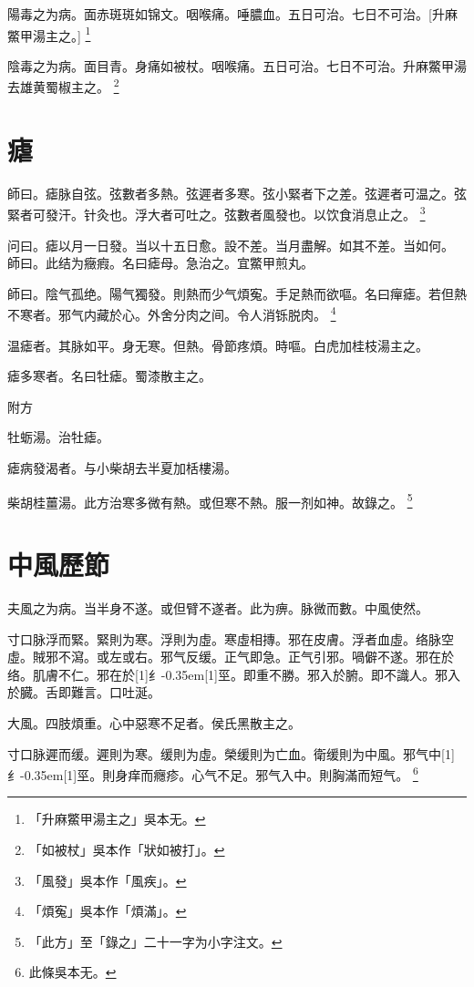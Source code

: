\documentclass[11pt,oneside,b5paper]{ctexbook}
\begin{document}
\begin{flushleft}
陽毒之为病。面赤斑斑如锦文。咽喉痛。唾膿血。五日可治。七日不可治。[升麻鱉甲湯主之。]
\footnote{「升麻鱉甲湯主之」吳本无。}

陰毒之为病。面目青。身痛如被杖。咽喉痛。五日可治。七日不可治。升麻鱉甲湯去雄黄蜀椒主之。
\footnote{「如被杖」吳本作「狀如被打」。}

\chapter{瘧}

師曰。瘧脉自弦。弦數者多熱。弦遲者多寒。弦小緊者下之差。弦遲者可温之。弦緊者可發汗。针灸也。浮大者可吐之。弦數者風發也。以饮食消息止之。
\footnote{「風發」吳本作「風疾」。}

问曰。瘧以月一日發。当以十五日愈。設不差。当月盡解。如其不差。当如何。\\
師曰。此结为癥瘕。名曰瘧母。急治之。宜鱉甲煎丸。

師曰。陰气孤绝。陽气獨發。則熱而少气煩寃。手足熱而欲嘔。名曰癉瘧。若但熱不寒者。邪气内藏於心。外舍分肉之间。令人消铄脱肉。
\footnote{「煩寃」吳本作「煩滿」。}

温瘧者。其脉如平。身无寒。但熱。骨節疼煩。時嘔。白虎加桂枝湯主之。

瘧多寒者。名曰牡瘧。蜀漆散主之。

附方

牡蛎湯。治牡瘧。

瘧病發渴者。与小柴胡去半夏加栝樓湯。

柴胡桂薑湯。此方治寒多微有熱。或但寒不熱。服一剂如神。故錄之。
\footnote{「此方」至「錄之」二十一字为小字注文。}

\chapter{中風歷節}

夫風之为病。当半身不遂。或但臂不遂者。此为痹。脉微而數。中風使然。

寸口脉浮而緊。緊則为寒。浮則为虛。寒虛相摶。邪在皮膚。浮者血虛。络脉空虛。賊邪不瀉。或左或右。邪气反缓。正气即急。正气引邪。喎僻不遂。邪在於络。肌膚不仁。邪在於{\hbox{\scalebox{0.68}[1]{纟}\kern-0.35em\scalebox{0.64}[1]{巠}}}。即重不勝。邪入於腑。即不識人。邪入於臓。舌即難言。口吐涎。

大風。四肢煩重。心中惡寒不足者。侯氏黑散主之。

寸口脉遲而缓。遲則为寒。缓則为虛。榮缓則为亡血。衛缓則为中風。邪气中{\hbox{\scalebox{0.68}[1]{纟}\kern-0.35em\scalebox{0.64}[1]{巠}}}。則身痒而癮疹。心气不足。邪气入中。則胸滿而短气。
\footnote{此條吳本无。}


\end{flushleft}
\end{document}

